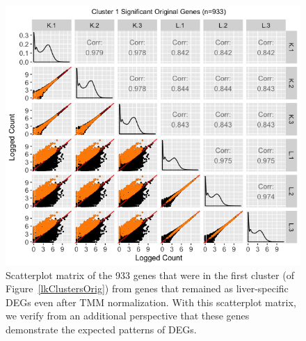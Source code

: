 \documentclass[11pt,a4paper,oldfontcommands,openany]{memoir}
\numberwithin{equation}{section} %
\begin{document}
\null
\begin{figure}[t!]
\begin{framed}
\centerline{\includegraphics[width=1\columnwidth]{MakeFigures/lkClustersOrigSM.jpg}}
\end{framed}
\caption{Scatterplot matrix of the 933 genes that were in the first cluster (of Figure~\ref{lkClustersOrig}) from genes that remained as liver-specific DEGs even after TMM normalization. With this scatterplot matrix, we verify from an additional perspective that these genes demonstrate the expected patterns of DEGs.
\label{lkClustersOrigSM}}
\end{figure}
\end{document}
